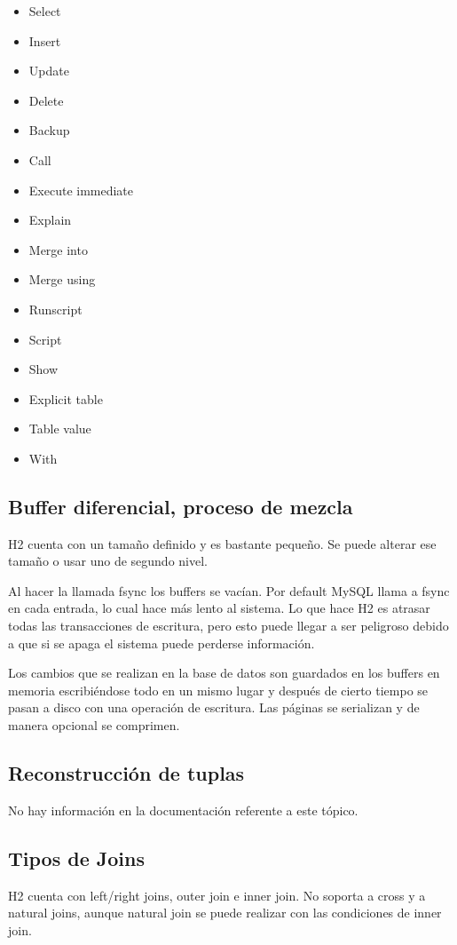 \documentclass{acmart}
\begin{document}
\begin{itemize}
\item Select
\item Insert
\item Update
\item Delete
\item Backup
\item Call
\item Execute immediate
\item Explain
\item Merge into
\item Merge using
\item Runscript
\item Script
\item Show
\item Explicit table
\item Table value
\item With

\end{itemize}

\subsection{Buffer diferencial, proceso de mezcla}
H2 cuenta con un tamaño definido y es bastante pequeño. Se puede alterar ese tamaño o usar uno de segundo nivel.  

Al hacer la llamada fsync los buffers se vacían. Por default MySQL llama a fsync en cada entrada, lo cual hace más lento al sistema. Lo que hace H2 es atrasar todas las transacciones de escritura, pero esto puede llegar a ser peligroso debido a que si se apaga el sistema puede perderse información. 

Los cambios que se realizan en la base de datos son guardados en los buffers en memoria escribiéndose todo en un mismo lugar y después de cierto tiempo se pasan a disco con una operación de escritura. Las páginas se serializan y de manera opcional se comprimen. 

\subsection{Reconstrucción de tuplas}
No hay información en la documentación referente a este tópico.

\subsection{Tipos de Joins}
H2 cuenta con left/right joins, outer join e inner join. No soporta a cross y a natural joins, aunque natural join se puede realizar con las condiciones de inner join. 
\end{document}
